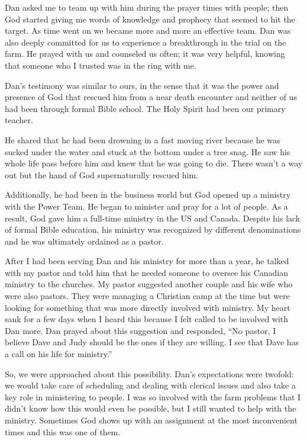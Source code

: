 \documentclass[twoside, 12pt]{book}
\begin{document}
Dan asked me to team up with him during the prayer times with people; then God started giving me words of knowledge and prophecy that seemed to hit the target. As time went on we became more and more an effective team. Dan was also deeply committed for us to experience a breakthrough in the trial on the farm. He prayed with us and counseled us often; it was very helpful, knowing that someone who I trusted was in the ring with me.

 Dan’s testimony was similar to ours, in the sense that it was the power and presence of God that rescued him from a near death encounter and neither of us had been through formal Bible school. The Holy Spirit had been our primary teacher.

He shared that he had been drowning in a fast moving river because he was sucked under the water and stuck at the bottom under a tree snag. He saw his whole life pass before him and knew that he was going to die. There wasn’t a way out but the hand of God supernaturally rescued him.

Additionally, he had been in the business world but God opened up a ministry with the Power Team. He began to minister and pray for a lot of people. As a result, God gave him a full-time ministry in the US and Canada. Despite his lack of formal Bible education, his ministry was recognized by different denominations and he was ultimately ordained as a pastor.

After I had been serving Dan and his ministry for more than a year, he talked with my pastor and told him that he needed someone to oversee his Canadian ministry to the churches. My pastor suggested another couple and his wife who were also pastors. They were managing a Christian camp at the time but were looking for something that was more directly involved with ministry. My heart sank for a few days when I heard this because I felt called to be involved with Dan more. Dan prayed about this suggestion and responded, “No pastor, I believe Dave and Judy should be the ones if they are willing. I see that Dave has a call on his life for ministry.”

So, we were approached about this possibility. Dan's expectations were twofold:  we would take care of scheduling and dealing with clerical issues and also take a key role in ministering to people. I was so involved with the farm problems that I didn't know how this would even be possible, but I still wanted to help with the ministry. Sometimes God shows up with an assignment at the most inconvenient times and this was one of them.
\end{document}

